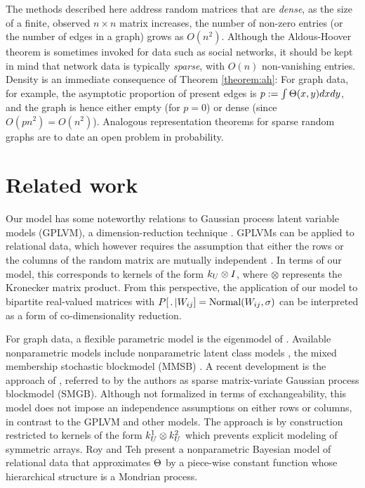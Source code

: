 \begin{rem}
  The methods described here address random matrices that are \emph{dense}, \ie as the size of a finite, observed $n\times n$ matrix increases,
  the number of non-zero entries (or the number of edges in a graph) grows as $O(n^2)$. Although the Aldous-Hoover theorem is sometimes invoked
  for data such as social networks, it should be kept in mind that network data is typically \emph{sparse}, with $O(n)$ non-vanishing entries.
  Density is an immediate consequence of Theorem \ref{theorem:ah}: For graph data, for example, the asymptotic proportion of present edges is
  ${p:=\int\Theta(x,y)dxdy}$, and the graph is hence either empty (for $p=0$) or dense (since
  $O(pn^2)=O(n^2)$). Analogous representation theorems for sparse random graphs are to date an open problem in probability.
\end{rem}



\section{Related work}
\label{sec:networks:related}

Our model has some noteworthy relations to Gaussian process latent variable models (GPLVM), a dimension-reduction technique
\citep[e.g.][]{Lawrence2009}.  GPLVMs can be applied to relational data, which however requires
the assumption that either the rows or the columns of the random matrix are mutually independent \cite{Lawrence2009}. 
In terms of our model, this
corresponds to kernels of the form $k_U \otimes I$, where $\otimes$ represents the Kronecker matrix product. From this perspective, the application of our model
to bipartite real-valued matrices with $P[\,.\,|W_{ij}]=\mbox{Normal}(W_{ij},\sigma)$ can be interpreted as 
a form of co-dimensionality reduction.

For graph data, a flexible parametric model is the eigenmodel of \citet{Hoff2007a}. Available nonparametric models include
nonparametric latent class models \cite{Kemp2006}, the mixed membership stochastic blockmodel (MMSB) \citep{Airoldi2008}.
A recent development is the approach of \citet{Yan:Xu:Qi:2011:1}, referred to by the authors as
sparse matrix-variate Gaussian process blockmodel (SMGB). Although not formalized in terms of exchangeability,
this model does not impose an independence assumptions on either rows or columns, in contrast to the GPLVM and other models.
The approach is by construction restricted to kernels of the form $k_U^1 \otimes k_U^2$ which prevents 
explicit modeling of symmetric arrays.
Roy and Teh \citep{Roy2009} present a nonparametric Bayesian model of relational data that approximates 
$\Theta$ by a piece-wise constant function whose hierarchical structure is a Mondrian process.

